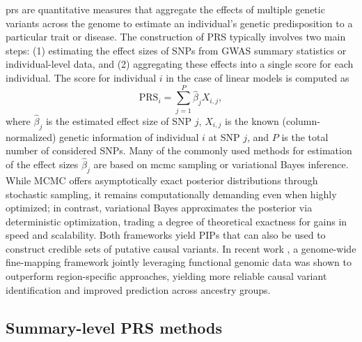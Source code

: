 \gls{prs} are quantitative measures that aggregate the effects of multiple genetic variants across the genome to estimate an individual's genetic predisposition to a particular trait or disease. The construction of PRS typically involves two main steps: (1) estimating the effect sizes of SNPs from GWAS summary statistics or individual-level data, and (2) aggregating these effects into a single score for each individual. The score for individual $i$ in the case of linear models is computed as
\begin{equation}
    \text{PRS}_i = \sum_{j=1}^{P} \hat{\beta}_j X_{i,j},
\end{equation}
where $\hat{\beta}_j$ is the estimated effect size of SNP $j$, $X_{i,j}$ is the known (column-normalized) genetic information of individual $i$ at SNP $j$, and $P$ is the total number of considered SNPs. Many of the commonly used methods for estimation of the effect sizes $\hat{\beta}_j$ are based on \gls{mcmc} sampling or variational Bayes inference. While MCMC offers asymptotically exact posterior distributions through stochastic sampling, it remains computationally demanding even when highly optimized; in contrast, variational Bayes approximates the posterior via deterministic optimization, trading a degree of theoretical exactness for gains in speed and scalability. Both frameworks yield PIPs that can also be used to construct credible sets of putative causal variants. In recent work \cite{Wu2024}, a genome-wide fine-mapping framework jointly leveraging functional genomic data was shown to outperform region-specific approaches, yielding more reliable causal variant identification and improved prediction across ancestry groups.



\subsection{Summary-level PRS methods}

